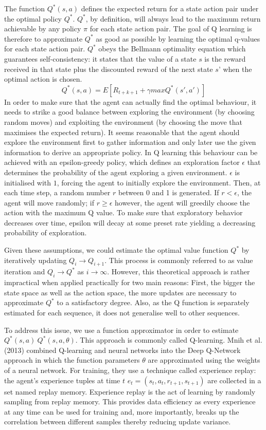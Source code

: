 \documentclass[12pt,a4paper]{article}
\begin{document}
The function $Q^*(s,a)$ defines the expected return for a state action pair under the optimal policy $Q^*$. $Q^*$, by definition, will always lead to the maximum return achievable by any policy $\pi$ for each state action pair. The goal of Q learning is therefore to approximate $Q^*$ as good as possible by learning the optimal q-values for each state action pair. $Q^*$ obeys the Bellmann optimality equation which guarantees self-consistency: it states that the value of a state $s$ is the reward received in that state plus the discounted reward of the next state $s’$ when the optimal action is chosen.
\[ 
 Q^*(s,a) = E\left[  R_{t+k+1} +  \gamma max Q^*(s',a') \right]
\]
In order to make sure that the agent can actually find the optimal behaviour, it needs to strike a good balance between exploring the environment (by choosing random moves) and exploiting the environment (by choosing the move that maximises the expected return). It seems reasonable that the agent should explore the environment first to gather information and only later use the given information to derive an appropriate policy. In Q learning this behaviour can be achieved with an epsilon-greedy policy, which defines an exploration factor $\epsilon$ that determines the probability of the agent exploring a given environment. $\epsilon$ is initialised with $1$, forcing the agent to initially explore the environment. Then, at each time step, a random number $r$ between 0 and 1 is generated. If $r < \epsilon$, the agent will move randomly; if $r \geq \epsilon$ however, the agent will greedily choose the action with the maximum Q value. To make sure that exploratory behavior decreases over time, epsilon will decay at some preset rate yielding a decreasing probability of exploration.

Given these assumptions, we could estimate the optimal value function $Q^*$ by iteratively updating $Q_i \rightarrow Q_{i+1}$. This process is commonly referred to as value iteration and $Q_i \rightarrow Q^*$ as $i \rightarrow \infty$. However, this theoretical approach is rather impractical when applied practically for two main reasons: First, the bigger the state space as well as the action space, the more updates are necessary to approximate $Q^*$ to a satisfactory degree. Also, as the Q function is separately estimated for each sequence, it does not generalise well to other sequences. 

To address this issue, we use a function approximator in order to estimate $Q^*(s,a) ~ Q^*(s,a, \theta)$. This approach is commonly called Q-learning. Mnih et al. (2013) combined Q-learning and neural networks into the Deep Q-Network approach in which the function parameters $\theta$ are approximated using the weights of a neural network. For training, they use a technique called experience replay: the agent’s experience tuples at time $t$ $e_t = (s_t, a_t, r_{t+1}, s_{t+1})$ are collected in a set named replay memory. Experience replay is the act of learning by randomly sampling from replay memory. This provides data efficiency as every experience at any time can be used for training and, more importantly, breaks up the correlation between different samples thereby reducing update variance. 
\end{document}
